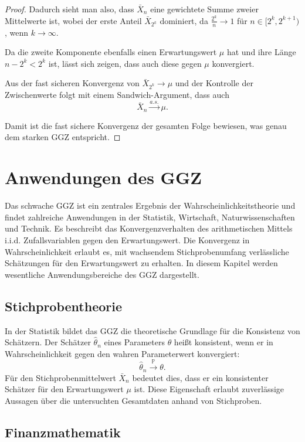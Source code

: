 \documentclass[aodsor,preprint]{imsart}
\numberwithin{equation}{section}
\theoremstyle{plain}
\begin{document}
\begin{proof}
Dadurch sieht man also, dass \( \bar{X}_n \) eine gewichtete Summe zweier Mittelwerte ist, wobei der erste Anteil \( \bar{X}_{2^k} \) dominiert, da \( \frac{2^k}{n} \to 1 \) für \( n \in [2^k, 2^{k+1}) \), wenn \( k \to \infty \).

Da die zweite Komponente ebenfalls einen Erwartungswert \( \mu \) hat und ihre Länge \( n - 2^k < 2^k \) ist, lässt sich zeigen, dass auch diese gegen \( \mu \) konvergiert.

Aus der fast sicheren Konvergenz von \( \bar{X}_{2^k} \to \mu \) und der Kontrolle der Zwischenwerte folgt mit einem Sandwich-Argument, dass auch
\[
\bar{X}_n \xrightarrow{a.s.} \mu.
\]

Damit ist die fast sichere Konvergenz der gesamten Folge bewiesen, was genau dem starken GGZ entspricht.
\end{proof}


\section{Anwendungen des GGZ}
\label{sec:anwendung}


Das schwache GGZ ist ein zentrales Ergebnis der Wahrscheinlichkeitstheorie und findet zahlreiche Anwendungen in der Statistik, Wirtschaft, Naturwissenschaften und Technik.
Es beschreibt das Konvergenzverhalten des arithmetischen Mittels i.i.d. Zufallsvariablen gegen den Erwartungswert.
Die Konvergenz in Wahrscheinlichkeit erlaubt es, mit wachsendem Stichprobenumfang verlässliche Schätzungen für den Erwartungswert zu erhalten.
In diesem Kapitel werden wesentliche Anwendungsbereiche des GGZ dargestellt.


\subsection{Stichprobentheorie}


In der Statistik bildet das GGZ die theoretische Grundlage für die Konsistenz von Schätzern. Der Schätzer \( \hat{\theta}_n \) eines Parameters \( \theta \) heißt konsistent, wenn er in Wahrscheinlichkeit gegen den wahren Parameterwert konvergiert:
\[
\hat{\theta}_n \xrightarrow{\mathbb{P}} \theta.
\]
Für den Stichprobenmittelwert \( \bar{X}_n \) bedeutet dies, dass er ein konsistenter Schätzer für den Erwartungswert \( \mu \) ist. Diese Eigenschaft erlaubt zuverlässige Aussagen über die untersuchten Gesamtdaten anhand von Stichproben.


\subsection{Finanzmathematik}
\end{document}
